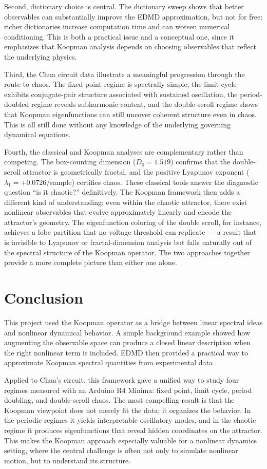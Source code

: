\documentclass[11pt]{article}
\begin{document}
Second, dictionary choice is central. The dictionary sweep shows that better observables can substantially improve the EDMD approximation, but not for free: richer dictionaries increase computation time and can worsen numerical conditioning. This is both a practical issue and a conceptual one, since it emphasizes that Koopman analysis depends on choosing observables that reflect the underlying physics.

Third, the Chua circuit data illustrate a meaningful progression through the route to chaos. The fixed-point regime is spectrally simple, the limit cycle exhibits conjugate-pair structure associated with sustained oscillation, the period-doubled regime reveals subharmonic content, and the double-scroll regime shows that Koopman eigenfunctions can still uncover coherent structure even in chaos. This is all still done without any knowledge of the underlying governing dynamical equations.

Fourth, the classical and Koopman analyses are complementary rather than competing. The box-counting dimension ($D_0 = 1.519$) confirms that the double-scroll attractor is geometrically fractal, and the positive Lyapunov exponent ($\lambda_1 = +0.0726$/sample) certifies chaos. These classical tools answer the diagnostic question ``is it chaotic?'' definitively. The Koopman framework then adds a different kind of understanding: even within the chaotic attractor, there exist nonlinear observables that evolve approximately linearly and encode the attractor's geometry. The eigenfunction coloring of the double scroll, for instance, achieves a lobe partition that no voltage threshold can replicate --- a result that is invisible to Lyapunov or fractal-dimension analysis but falls naturally out of the spectral structure of the Koopman operator. The two approaches together provide a more complete picture than either one alone.

\section{Conclusion}
This project used the Koopman operator as a bridge between linear spectral ideas and nonlinear dynamical behavior. A simple background example showed how augmenting the observable space can produce a closed linear description when the right nonlinear term is included. EDMD then provided a practical way to approximate Koopman spectral quantities from experimental data \citep{koopman1931,williams2015}.

Applied to Chua's circuit, this framework gave a unified way to study four regimes measured with an Arduino R4 Minima: fixed point, limit cycle, period doubling, and double-scroll chaos. The most compelling result is that the Koopman viewpoint does not merely fit the data; it organizes the behavior. In the periodic regimes it yields interpretable oscillatory modes, and in the chaotic regime it produces eigenfunctions that reveal hidden coordinates on the attractor. This makes the Koopman approach especially valuable for a nonlinear dynamics setting, where the central challenge is often not only to simulate nonlinear motion, but to understand its structure.



\end{document}
